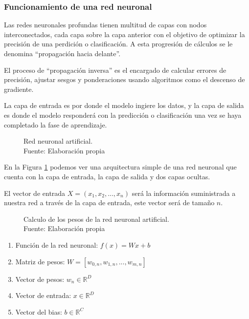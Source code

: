 \subsubsection{Funcionamiento de una red neuronal \label{neural-network}}

Las redes neuronales profundas tienen multitud de capas con nodos interconectados, cada capa sobre la capa anterior con el objetivo de optimizar la precisión de una perdición o clasificación. A esta progresión de cálculos se le denomina ``propagación hacia delante''.

El proceso de ``propagación inversa'' es el encargado de calcular errores de precisión, ajustar sesgos y ponderaciones usando algoritmos como el descenso de gradiente.


La capa de entrada es por donde el modelo ingiere los datos, y la capa de salida es donde el modelo responderá con la predicción o clasificación una vez se haya completado la fase de aprendizaje.

\begin{figure}[H]
  \centering
  \centerline{}
  \caption{Red neuronal artificial.\\Fuente: Elaboración propia}
  \label{fig:artificial-neuronal-network}
\end{figure}

En la Figura \ref{fig:artificial-neuronal-network} podemos ver una arquitectura simple de una red neuronal que cuenta con la capa de entrada, la capa de salida y dos capas ocultas.

El vector de entrada $X = (x_{1}, x_{2}, ..., x_{n})$ será la información suministrada a nuestra red a través de la capa de entrada, este vector será de tamaño $n$.


\begin{figure}[H]
  \centering
  \captionsetup{justification=centering}
  \centerline{}
  \caption{Calculo de los pesos de la red neuronal artificial.\\Fuente: Elaboración propia}
  \label{fig:notation}
\end{figure}

\begin{enumerate}
  \item Función de la red neuronal: $f(x) = W x + b$
  \item Matriz de pesos: $W = \left[w_{0,n}, w_{1,n}, ...,w_{m,n}\right]$
  \item Vector de pesos: $w_{n} \in \mathbb{R}^{D}$
  \item Vector de entrada: $x \in \mathbb{R}^{D}$
  \item Vector del bias: $b \in \mathbb{R}^{C}$
\end{enumerate}

